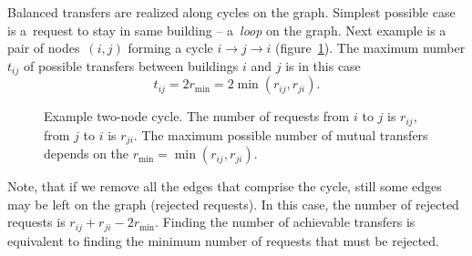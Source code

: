 \documentclass[paper=a4,parskip=half,DIV=12]{leetcode}
\begin{document}
Balanced transfers are realized along cycles on the graph. Simplest possible
case is a~request to stay in same building -- a~{\em loop} on the graph.
Next example is a pair of nodes~${(i, j)}$ forming a cycle $i \to j \to i$
(figure~\ref{fig:DRV1T}). The maximum number $t_{ij}$ of possible transfers
between buildings $i$ and $j$ is in this case
\begin{equation}
  t_{ij} = 2 r_{\min} = 2 \min{(r_{ij}, r_{ji})}.
  \label{eq:FMMLO}
\end{equation}
\begin{figure}[htbp]
  \centering
  \caption{Example two-node cycle. The number of requests from $i$ to $j$ is
  $r_{ij}$, from $j$ to $i$ is $r_{ji}$. The maximum possible number of mutual
  transfers depends on the $r_{\min} = \min{(r_{ij}, r_{ji})}$.}
  \label{fig:DRV1T}
\end{figure}
Note, that if we remove all the edges that comprise the cycle, still some edges
may be left on the graph (rejected requests). In this case, the number of
rejected requests is $r_{ij} + r_{ji} - 2 r_{\min}$. Finding the number of
achievable transfers is equivalent to finding the minimum number of requests
that must be rejected.
\end{document}
